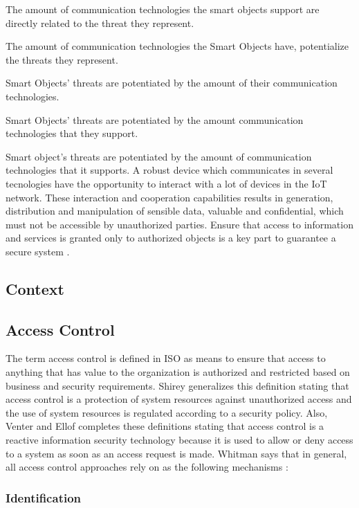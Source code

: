 \documentclass[letterpaper,conference]{IEEEtran}
\begin{document}
The amount of communication technologies the smart objects support are directly related to the threat they represent.

The amount of communication technologies the Smart Objects have, potentialize the threats they represent.

Smart Objects' threats are potentiated by the amount of their communication technologies.

Smart Objects' threats are potentiated by the amount communication technologies that they support.

Smart object's threats are potentiated by the amount of communication technologies that it supports. 
A robust device which communicates in several tecnologies have the opportunity to interact with a lot of 
devices in the IoT network. These interaction and cooperation capabilities results in generation, 
distribution and manipulation of sensible data, valuable and confidential, which 
must not be accessible by unauthorized parties. Ensure that access to information and services is granted only to 
authorized objects is a key part to guarantee a secure system \cite{covington2002context}.

\subsection{Context}

\subsection{Access Control}

The term access control is defined in ISO \cite{ISO27000} as means to ensure that access to anything that 
has value to the organization is authorized and restricted based on business and security requirements. Shirey 
\cite{shirey2007internet} generalizes this definition stating that access control is
a protection of system resources against unauthorized access and the use of 
system resources is regulated according to a security policy. Also, Venter and Ellof 
\cite{venter2003taxonomy} completes these definitions stating that access control is a reactive information 
security technology because it is used to allow or deny access to a system as soon as an access request is 
made. Whitman \cite{whitman2011principles} says that in general, all access control approaches rely on as the following 
mechanisms \cite{shirey2007internet} \cite{ISO27000}:

\subsubsection{Identification}
\end{document}
